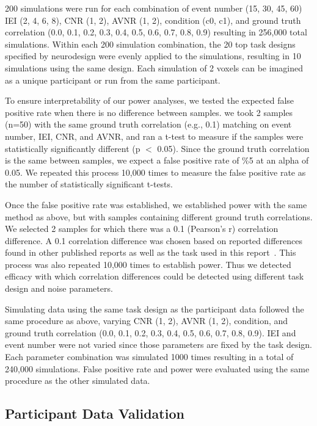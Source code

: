 \documentclass[phd,appendix,figures]{uithesis}
\begin{document}
200 simulations were run for each combination of event number
(15, 30, 45, 60) IEI (2, 4, 6, 8),  CNR (1, 2), AVNR (1, 2), condition (c0, c1),
and ground truth correlation
(0.0, 0.1, 0.2, 0.3, 0.4, 0.5, 0.6, 0.7, 0.8, 0.9)
resulting in 256,000 total simulations.
Within each 200 simulation combination, the 20 top task designs specified by
neurodesign were evenly applied to the simulations, resulting in 10 simulations
using the same design.
Each simulation of 2 voxels can be imagined as a unique participant or run from
the same participant.

To ensure interpretability of our power analyses, we tested
the expected false positive rate when there is no difference between samples.
we took 2 samples (n=50) with the same ground truth correlation (e.g., 0.1)
matching on event number, IEI, CNR, and AVNR, and ran a t-test to measure if the samples
were statistically significantly different (p $<$ 0.05).
Since the ground truth correlation is the same between samples,
we expect a false positive rate of \%5 at an alpha of 0.05.
We repeated this process 10,000 times to measure the false positive rate as
the number of statistically significant t-tests.

Once the false positive rate was established, we established power with the same method as above,
but with samples containing different ground truth correlations.
We selected 2 samples for which there was a 0.1 (Pearson's r) correlation difference.
A 0.1 correlation difference was chosen based on reported differences found in other published
reports as well as the task used in this report~\cite{Katsura2014,Lee2017,Turner2017,Lin2019,Huang2019}.
This process was also repeated 10,000 times to establish power.
Thus we detected efficacy with which correlation differences could be detected
using different task design and noise parameters.

Simulating data using the same task design as the participant data followed the same
procedure as above, varying CNR (1, 2), AVNR (1, 2), condition,
and ground truth correlation (0.0, 0.1, 0.2, 0.3, 0.4, 0.5, 0.6, 0.7, 0.8, 0.9).
IEI and event number were not varied since those parameters are fixed by the
task design.
Each parameter combination was simulated 1000 times resulting in a total of 240,000 simulations.
False positive rate and power were evaluated using the same procedure as the other simulated data.

\subsection*{Participant Data Validation}
\label{methods:task-switch}
\end{document}
